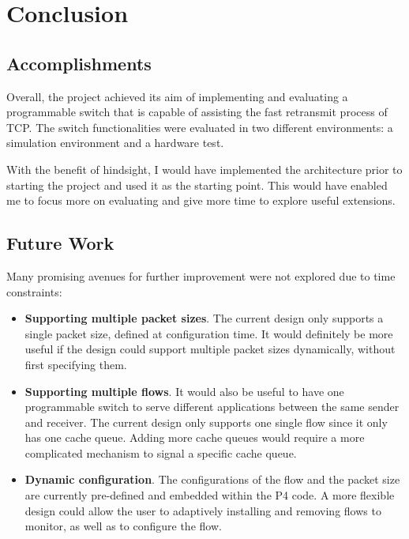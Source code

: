 \chapter{Conclusion}
\section{Accomplishments}
Overall, the project achieved its aim of implementing and evaluating a programmable switch that is capable of assisting the fast retransmit process of TCP. The switch functionalities were evaluated in two different environments: a simulation environment and a hardware test. 


With the benefit of hindsight, I would have implemented the architecture prior to starting the project and used it as the starting point. This would have enabled me to focus more on evaluating and give more time to explore useful extensions.

\section{Future Work}

Many promising avenues for further improvement were not explored due to time constraints:

\begin{itemize}
	\item \textbf{Supporting multiple packet sizes}. The current design only supports a single packet size, defined at configuration time. It would definitely be more useful if the design could support multiple packet sizes dynamically, without first specifying them.
	
	\item \textbf{Supporting multiple flows}. It would also be useful to have one programmable switch to serve different applications between the same sender and receiver. The current design only supports one single flow since it only has one cache queue. Adding more cache queues would require a more complicated mechanism to signal a specific cache queue. 
	
	\item \textbf{Dynamic configuration}. The configurations of the flow and the packet size are currently pre-defined and embedded within the P4 code. A more flexible design could allow the user to adaptively installing and removing flows to monitor, as well as to configure the flow. 
	
\end{itemize}

